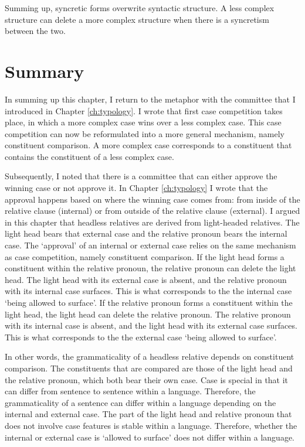 Summing up, syncretic forms overwrite syntactic structure. A less complex structure can delete a more complex structure when there is a syncretism between the two.

\section{Summary}

In summing up this chapter, I return to the metaphor with the committee that I introduced in Chapter \ref{ch:typology}. I wrote that first case competition takes place, in which a more complex case wins over a less complex case. This case competition can now be reformulated into a more general mechanism, namely constituent comparison. A more complex case corresponds to a constituent that contains the constituent of a less complex case.

Subsequently, I noted that there is a committee that can either approve the winning case or not approve it. In Chapter \ref{ch:typology} I wrote that the approval happens based on where the winning case comes from: from inside of the relative clause (internal) or from outside of the relative clause (external). I argued in this chapter that headless relatives are derived from light-headed relatives. The light head bears that external case and the relative pronoun bears the internal case. The `approval' of an internal or external case relies on the same mechanism as case competition, namely constituent comparison. If the light head forms a constituent within the relative pronoun, the relative pronoun can delete the light head. The light head with its external case is absent, and the relative pronoun with its internal case surfaces. This is what corresponds to the the internal case `being allowed to surface'. If the relative pronoun forms a constituent within the light head, the light head can delete the relative pronoun. The relative pronoun with its internal case is absent, and the light head with its external case surfaces. This is what corresponds to the the external case `being allowed to surface'.

In other words, the grammaticality of a headless relative depends on constituent comparison. The constituents that are compared are those of the light head and the relative pronoun, which both bear their own case. Case is special in that it can differ from sentence to sentence within a language. Therefore, the grammaticality of a sentence can differ within a language depending on the internal and external case. The part of the light head and relative pronoun that does not involve case features is stable within a language. Therefore, whether the internal or external case is `allowed to surface' does not differ within a language.

